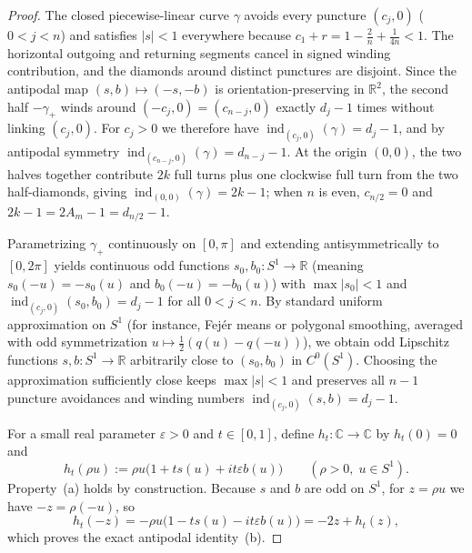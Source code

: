 \documentclass[11pt,a4paper]{amsart}
\numberwithin{equation}{section}
\theoremstyle{definition}
\newcommand{\R}{\mathbb{R}}
\newcommand{\C}{\mathbb{C}}
\newcommand{\ind}{\operatorname{ind}}
\begin{document}
\begin{proof}
The closed piecewise-linear curve $\gamma$ avoids every puncture $(c_j, 0)$ ($0 < j < n$) and satisfies $|s| < 1$ everywhere because $c_1 + r = 1 - \frac{2}{n} + \frac{1}{4n} < 1$. The horizontal outgoing and returning segments cancel in signed winding contribution, and the diamonds around distinct punctures are disjoint. Since the antipodal map $(s,b) \mapsto (-s,-b)$ is orientation-preserving in $\R^2$, the second half $-\gamma_+$ winds around $(-c_j, 0) = (c_{n-j}, 0)$ exactly $d_j - 1$ times without linking $(c_j, 0)$. For $c_j > 0$ we therefore have $\ind_{(c_j,0)}(\gamma) = d_j - 1$, and by antipodal symmetry $\ind_{(c_{n-j},0)}(\gamma) = d_{n-j} - 1$. At the origin $(0,0)$, the two halves together contribute $2k$ full turns plus one clockwise full turn from the two half-diamonds, giving $\ind_{(0,0)}(\gamma) = 2k - 1$; when $n$ is even, $c_{n/2} = 0$ and $2k - 1 = 2A_m - 1 = d_{n/2} - 1$.

Parametrizing $\gamma_+$ continuously on $[0,\pi]$ and extending antisymmetrically to $[0,2\pi]$ yields continuous odd functions $s_0, b_0 : S^1 \to \R$ (meaning $s_0(-u) = -s_0(u)$ and $b_0(-u) = -b_0(u)$) with $\max |s_0| < 1$ and $\ind_{(c_j,0)}(s_0, b_0) = d_j - 1$ for all $0 < j < n$. By standard uniform approximation on $S^1$ (for instance, Fej\'er means or polygonal smoothing, averaged with odd symmetrization $u \mapsto \frac{1}{2}(q(u)-q(-u))$), we obtain odd Lipschitz functions $s, b : S^1 \to \R$ arbitrarily close to $(s_0, b_0)$ in $C^0(S^1)$. Choosing the approximation sufficiently close keeps $\max |s| < 1$ and preserves all $n-1$ puncture avoidances and winding numbers $\ind_{(c_j,0)}(s,b) = d_j - 1$.

For a small real parameter $\varepsilon > 0$ and $t \in [0,1]$, define $h_t : \C \to \C$ by $h_t(0) = 0$ and
\begin{equation}
\label{eq:def-ht}
h_t(\rho u) := \rho u \bigl(1 + t s(u) + i t \varepsilon b(u)\bigr) \qquad (\rho > 0,\; u \in S^1).
\end{equation}
Property~(a) holds by construction. Because $s$ and $b$ are odd on $S^1$, for $z = \rho u$ we have $-z = \rho(-u)$, so
\[
h_t(-z) = -\rho u \bigl(1 - t s(u) - i t \varepsilon b(u)\bigr) = -2z + h_t(z),
\]
which proves the exact antipodal identity~(b).


\end{proof}
\end{document}
